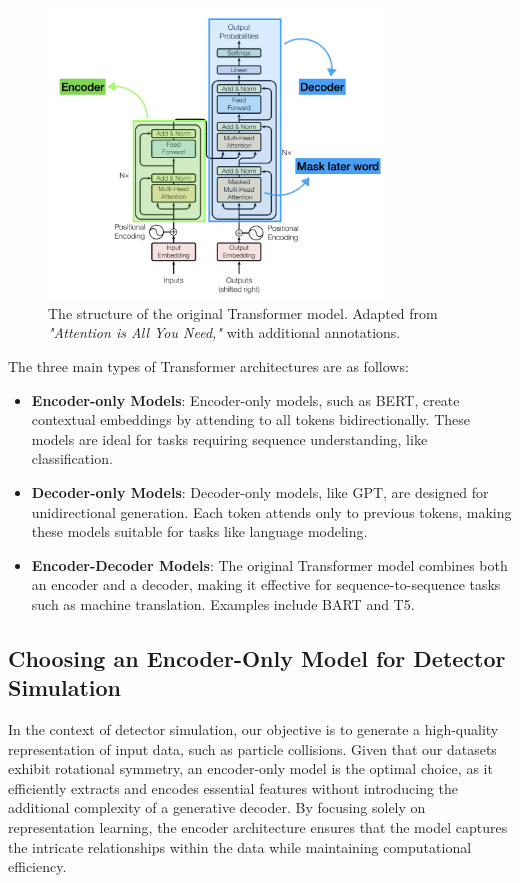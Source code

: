 \begin{figure}[ht]
    \centering
    \includegraphics[width=0.8\textwidth]{Figures/transformerblock.png}
    \caption{The structure of the original Transformer model. Adapted from \textit{"Attention is All You Need,"} with additional annotations.}
    \label{fig:transformer_structure}
\end{figure}

The three main types of Transformer architectures are as follows:

\begin{itemize}
    \item \textbf{Encoder-only Models}: Encoder-only models, such as BERT, create contextual embeddings by attending to all tokens bidirectionally. These models are ideal for tasks requiring sequence understanding, like classification.
    
    \item \textbf{Decoder-only Models}: Decoder-only models, like GPT, are designed for unidirectional generation. Each token attends only to previous tokens, making these models suitable for tasks like language modeling.
    
    \item \textbf{Encoder-Decoder Models}: The original Transformer model combines both an encoder and a decoder, making it effective for sequence-to-sequence tasks such as machine translation. Examples include BART and T5.
\end{itemize}

\subsection{Choosing an Encoder-Only Model for Detector Simulation}
In the context of detector simulation, our objective is to generate a high-quality representation of input data, such as particle collisions. Given that our datasets exhibit rotational symmetry, an encoder-only model is the optimal choice, as it efficiently extracts and encodes essential features without introducing the additional complexity of a generative decoder. By focusing solely on representation learning, the encoder architecture ensures that the model captures the intricate relationships within the data while maintaining computational efficiency.


